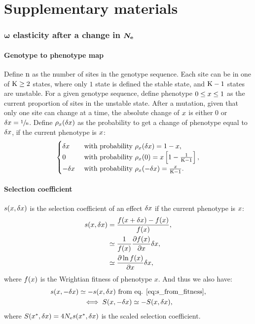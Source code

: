 \documentclass{article}
\begin{document}
\part*{Supplementary materials}
\tableofcontents
\section{$\bm{\omega}$ elasticity after a change in $\bm{N_{\mathrm{e}}}$}
\subsection{Genotype to phenotype map}
Define $\text{n}$ as the number of sites in the genotype sequence.
Each site can be in one of $\text{K} \geq 2$ states, where only $1$ state is defined the stable state, and $\text{K} - 1$ states are unstable.
For a given genotype sequence, define phenotype $0 \leq x \leq 1$ as the current proportion of sites in the unstable state.
After a mutation, given that only one site can change at a time, the absolute change of $x$ is either $0$ or $\delta x=\sfrac{1}{\text{n}}$.
Define $\rho_{x}(\delta x)$ as the probability to get a change of phenotype equal to $\delta x$, if the current phenotype is $x$:\\
\begin{gather}
\begin{cases}
\delta x &\text{ with probability } \rho_{x}(\delta x) = 1-x, \\
0 &\text{ with probability } \rho_{x}(0) = x \left[1 - \frac{1}{\text{K} - 1}\right], \\
-\delta x &\text{ with probability } \rho_{x}(-\delta x) = \frac{x}{\text{K} - 1}.\\
\end{cases} \label{eq:proba}
\end{gather}
\subsection{Selection coefficient}
$s(x, \delta x)$ is the selection coefficient of an effect $\delta x$ if the current phenotype is $x$:
\begin{align}
s(x, \delta x) &= \frac{f(x + \delta x) - f(x)}{f( x)}, \\
 &\simeq \frac{1}{f(x)}\frac{ \partial f(x) }{\partial x} \delta x, \\
 &\simeq \frac{ \partial \ln f(x) }{\partial x} \delta x, \label{eq:s_from_fitness}
\end{align}
where $f( x)$ is the Wrightian fitness of phenotype $x$. And thus we also have:
\begin{gather}
s(x, -\delta x) \simeq - s(x, \delta x) \text{ from eq. \ref{eq:s_from_fitness}} \label{eq:s_minus_deltax}, \\
\iff S(x, -\delta x) \simeq - S(x, \delta x), \label{eq:S_minus_deltax}
\end{gather}
where $S(x^{*}, \delta x) = 4N_{\mathrm{e}} s (x^{*}, \delta x)$ is the scaled selection coefficient.
\end{document}

